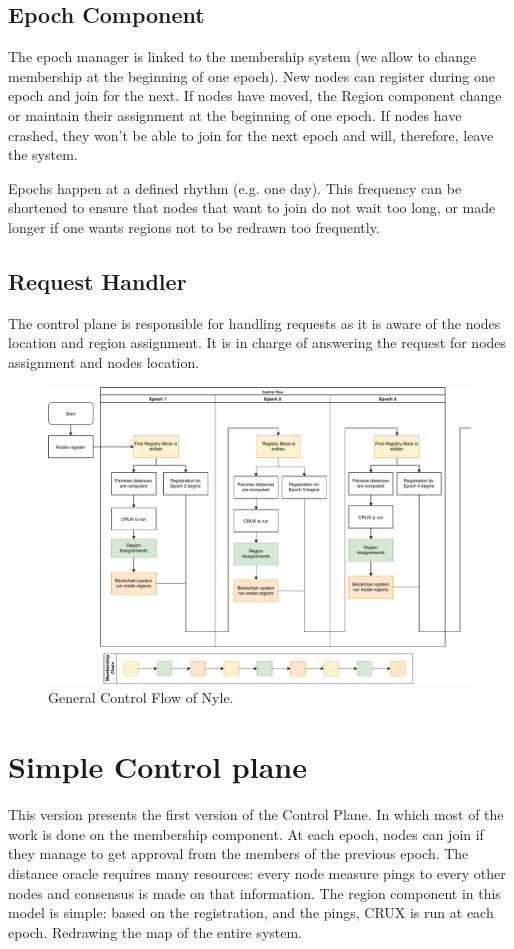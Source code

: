 \documentclass[a4paper,11pt,oneside]{report}
\begin{document}
\subsection{Epoch Component} The epoch manager is linked to the membership
system (we allow to change membership at the beginning of one epoch). New nodes
can register during one epoch and join for the next. If nodes have moved, the Region
component change or maintain their assignment at the beginning of one
epoch. If nodes have crashed, they won't be able to join for the next epoch and
will, therefore, leave the system.

Epochs happen at a defined rhythm (e.g. one day). This frequency can be
shortened to ensure that nodes that want to join do not wait too long, or made
longer if one wants regions not to be redrawn too frequently. 

\subsection{Request Handler} The control plane is responsible for handling
requests as it is aware of the nodes location and region assignment. It is
in charge of answering the request for nodes assignment and nodes location. 

\begin{figure}[!h] 
\centering
\includegraphics[width=400pt]{figures/Nyle_controlflow}
\caption{General Control Flow of Nyle. }
\label{fig:controlflow}
\end{figure}

\section{Simple Control plane} This version presents the first version of the
Control Plane. In which most of the work is done on the membership component.
At each epoch, nodes can join if they manage to get approval from the members
of the previous epoch. The distance oracle requires many resources: every
node measure pings to every other nodes and consensus is made on that
information. The region component in this model is simple: based on the
registration, and the pings, CRUX is run at each epoch. Redrawing the map of
the entire system. 
\end{document}
